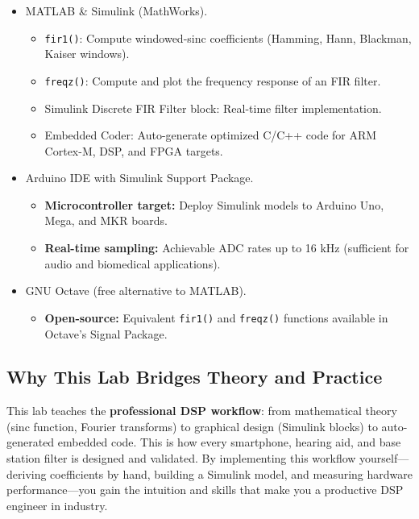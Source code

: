 \documentclass[11pt,letterpaper]{article}
\begin{document}
\begin{itemize}
    \item MATLAB \& Simulink (MathWorks).
    \begin{itemize}
        \item \texttt{fir1()}: Compute windowed-sinc coefficients (Hamming, Hann, Blackman, Kaiser windows).
        \item \texttt{freqz()}: Compute and plot the frequency response of an FIR filter.
        \item Simulink Discrete FIR Filter block: Real-time filter implementation.
        \item Embedded Coder: Auto-generate optimized C/C++ code for ARM Cortex-M, DSP, and FPGA targets.
    \end{itemize}

    \item Arduino IDE with Simulink Support Package.
    \begin{itemize}
        \item \textbf{Microcontroller target:} Deploy Simulink models to Arduino Uno, Mega, and MKR boards.
        \item \textbf{Real-time sampling:} Achievable ADC rates up to 16 kHz (sufficient for audio and biomedical applications).
    \end{itemize}

    \item GNU Octave (free alternative to MATLAB).
    \begin{itemize}
        \item \textbf{Open-source:} Equivalent \texttt{fir1()} and \texttt{freqz()} functions available in Octave's Signal Package.
    \end{itemize}
\end{itemize}

\subsection*{Why This Lab Bridges Theory and Practice}

This lab teaches the \textbf{professional DSP workflow}: from mathematical theory (sinc function, Fourier transforms) to graphical design (Simulink blocks) to auto-generated embedded code. This is how every smartphone, hearing aid, and base station filter is designed and validated. By implementing this workflow yourself—deriving coefficients by hand, building a Simulink model, and measuring hardware performance—you gain the intuition and skills that make you a productive DSP engineer in industry.
\end{document}
